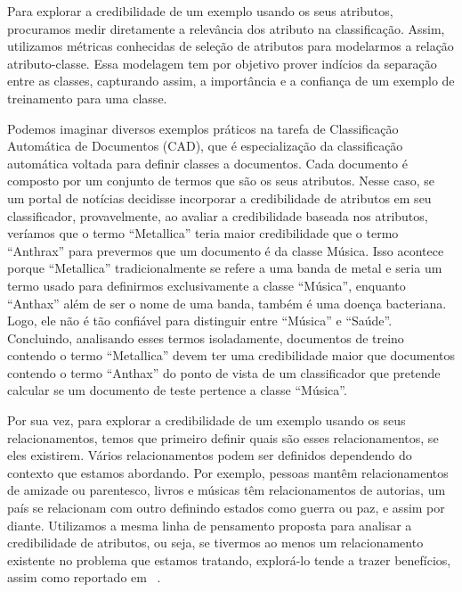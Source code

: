 Para explorar a credibilidade de um exemplo usando os seus atributos, procuramos medir diretamente a relevância dos atributo na classificação. Assim, utilizamos métricas conhecidas de seleção de atributos para modelarmos a relação atributo-classe. Essa modelagem tem por objetivo prover indícios da separação entre as classes, capturando assim, a importância e a confiança de um exemplo de treinamento para uma classe.

Podemos imaginar diversos exemplos práticos na tarefa de Classificação Automática de Documentos (\textsc{CAD}), que é especialização da classificação automática voltada para definir classes a documentos. Cada documento é composto por um conjunto de termos que são os seus atributos. Nesse caso, se um portal de notícias decidisse incorporar a credibilidade de atributos em seu classificador, provavelmente, ao avaliar a credibilidade baseada nos atributos, veríamos que o termo ``Metallica'' teria maior credibilidade que o termo ``Anthrax'' para prevermos que um documento é da classe Música. Isso acontece porque ``Metallica'' tradicionalmente se refere a uma banda de metal e seria um termo usado para definirmos exclusivamente a classe ``Música'', enquanto ``Anthax'' além de ser o nome de uma banda, também é uma doença bacteriana. Logo, ele não é tão confiável para distinguir entre ``Música'' e ``Saúde''.
Concluindo, analisando esses termos isoladamente, documentos de treino contendo o termo ``Metallica'' devem ter uma credibilidade maior que documentos contendo o termo ``Anthax'' do ponto de vista de um classificador que pretende calcular se um documento de teste pertence a classe ``Música''.

Por sua vez, para explorar a credibilidade de um exemplo usando os seus relacionamentos, temos que primeiro definir quais são esses relacionamentos, se eles existirem. 
Vários relacionamentos podem ser definidos dependendo do contexto que estamos abordando. Por exemplo, pessoas mantêm relacionamentos de amizade ou parentesco, livros e músicas têm relacionamentos de autorias, um país se relacionam com outro definindo estados como guerra ou paz, e assim por diante. Utilizamos a mesma linha de pensamento proposta para analisar a credibilidade de atributos, ou seja, se tivermos ao menos um relacionamento existente no problema que estamos tratando, explorá-lo tende a trazer benefícios, assim como reportado em ~\cite{Macskassy04}.

